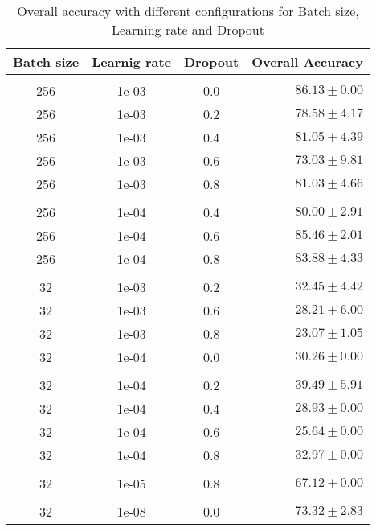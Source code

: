 \begin{table}[!htbp]
  \centering
  \begin{tabular}{cccr} 
      Batch size & Learnig rate & Dropout & Overall Accuracy\\[0.2cm] 
      \hline \\[-0.2cm]
      256 &   1e-03 &   0.0 & $86.13 \pm 0.00$\\
      256 &   1e-03 &   0.2 & $78.58 \pm 4.17$\\
      256 &   1e-03 &   0.4 & $81.05 \pm 4.39$\\
      256 &   1e-03 &   0.6 & $73.03 \pm 9.81$\\
      256 &   1e-03 &   0.8 & $81.03 \pm 4.66$\\[0.05cm] \hline \\[-0.25cm]

      256 &   1e-04 &   0.4 & $80.00 \pm 2.91$\\
      256 &   1e-04 &   0.6 & $85.46 \pm 2.01$\\
      256 &   1e-04 &   0.8 & $83.88 \pm 4.33$\\[0.05cm] \hline \\[-0.25cm]

      32  &   1e-03 &   0.2 & $32.45 \pm 4.42$\\
      32  &   1e-03 &   0.6 & $28.21 \pm 6.00$\\
      32  &   1e-03 &   0.8 & $23.07 \pm 1.05$\\
      32  &   1e-04 &   0.0 & $30.26 \pm 0.00$\\[0.05cm] \hline \\[-0.25cm]

      32  &   1e-04 &   0.2 & $39.49 \pm 5.91$\\
      32  &   1e-04 &   0.4 & $28.93 \pm 0.00$\\
      32  &   1e-04 &   0.6 & $25.64 \pm 0.00$\\
      32  &   1e-04 &   0.8 & $32.97 \pm 0.00$\\[0.05cm] \hline \\[-0.25cm]

      32  &   1e-05 &   0.8 & $67.12 \pm 0.00$\\[0.05cm] \hline \\[-0.25cm]
      32  &   1e-08 &   0.0 & $73.32 \pm 2.83$
  \end{tabular}
  \caption{Overall accuracy with different configurations for Batch size, Learning rate and Dropout}
  \label{tab:AJRNNBatchSizeResults}
\end{table}


